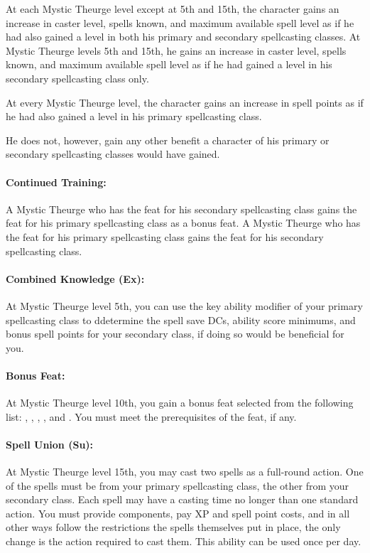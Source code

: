 At each Mystic Theurge level except at 5th and 15th, the character gains an increase in caster level, spells known, and maximum available spell level as if he had also gained a level in both his primary and secondary spellcasting classes. At Mystic Theurge levels 5th and 15th, he gains an increase in caster level, spells known, and maximum available spell level as if he had gained a level in his secondary spellcasting class only.

At every Mystic Theurge level, the character gains an increase in spell points as if he had also gained a level in his primary spellcasting class.

He does not, however, gain any other benefit a character of his primary or secondary spellcasting classes would have gained.
\paragraph{Continued Training:} A Mystic Theurge who has the  feat for his secondary spellcasting class gains the feat for his primary spellcasting class as a bonus feat. A Mystic Theurge who has the feat for his primary spellcasting class gains the feat for his secondary spellcasting class.

\paragraph{Combined Knowledge (Ex):} At Mystic Theurge level 5th, you can use the key ability modifier of your primary spellcasting class to ddetermine the spell save DCs, ability score minimums, and bonus spell points for your secondary class, if doing so would be beneficial for you.

\paragraph{Bonus Feat:} At Mystic Theurge level 10th, you gain a bonus feat selected from the following list: , , , ,  and . You must meet the prerequisites of the feat, if any.

\paragraph{Spell Union (Su):} At Mystic Theurge level 15th, you may cast two spells as a full-round action. One of the spells must be from your primary spellcasting class, the other from your secondary class. Each spell may have a casting time no longer than one standard action. You must provide components, pay XP and spell point costs, and in all other ways follow the restrictions the spells themselves put in place, the only change is the action required to cast them. This ability can be used once per day.